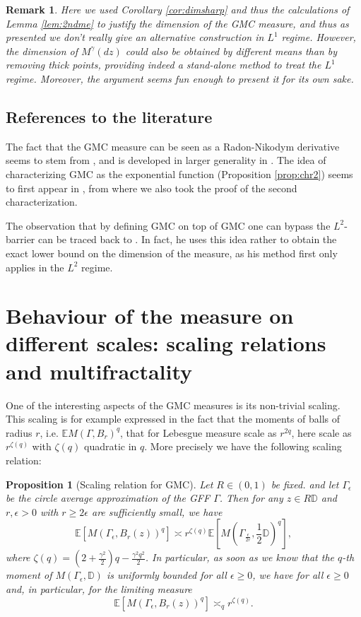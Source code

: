 \documentclass[11pt]{amsart}
\newtheorem{rem}[thm]{Remark}
\newtheorem{prop}[thm]{Proposition}
\newcommand{\D}{\mathbb D}
\newcommand{\E}{\mathbb E}
\renewcommand{\1}{\mathbf 1}
\newcommand{\eps}{\epsilon}
\begin{document}
\begin{rem}
Here we used Corollary \ref{cor:dimsharp} and thus the calculations of Lemma \ref{lem:2ndme} to justify the dimension of the GMC measure, and thus as presented we don't really give an alternative construction in $L^1$ regime. However, the dimension of $M^\gamma(dz)$ could also be obtained by different means than by removing thick points, providing indeed a stand-alone method to treat the $L^1$ regime. Moreover, the argument seems fun enough to present it for its own sake.
\end{rem}

\subsection*{References to the literature}

The fact that the GMC measure can be seen as a Radon-Nikodym derivative seems to stem from \cite{Sato}, and is developed in larger generality in \cite{Sha}. The idea of characterizing GMC as the exponential function (Proposition \ref{prop:chr2}) seems to first appear in \cite{Sha}, from where we also took the proof of the second characterization. 

The observation that by defining GMC on top of GMC one can bypass the $L^2$-barrier can be traced back to \cite{Kah}. In fact, he uses this idea rather to obtain the exact lower bound on the dimension of the measure, as his method first only applies in the $L^2$ regime. 

\section{Behaviour of the measure on different scales: scaling relations and multifractality}\label{sec:scaling}

One of the interesting aspects of the GMC measures is its non-trivial scaling. This scaling is for example expressed in the fact that the moments of balls of radius $r$, i.e. $\E M(\Gamma,B_r)^q$, that for Lebesgue measure scale as $r^{2q}$, here scale as $r^{\zeta(q)}$ with $\zeta(q)$ quadratic in $q$. More precisely we have the following scaling relation:

\begin{prop}[Scaling relation for GMC]\label{prop:SR}
Let $R \in (0,1)$ be fixed. and let $\Gamma_\eps$ be the circle average approximation of the GFF $\Gamma$. Then for any $z \in R\D$  and $r, \eps > 0$ with $r \geq 2\eps$ are sufficiently small, we have 
$$\E \left[M(\Gamma_\eps, B_r(z))^q\right] \asymp r^{\zeta(q)}\E \left[M(\Gamma_{\frac{\eps}{2r}}, \frac{1}{2}\D)^q\right],$$
where $\zeta(q) = (2+\frac{\gamma^2}{2})q - \frac{\gamma^2 q^2}{2}$. In particular, as soon as we know that the $q$-th moment of $M(\Gamma_\eps,\D)$ is uniformly bounded for all $\eps \geq 0$, we have for all $\eps \geq 0$ and, in particular, for the limiting measure 
$$\E \left[M(\Gamma_\eps, B_r(z))^q\right] \asymp_q r^{\zeta(q)}.$$
\end{prop}
\end{document}

